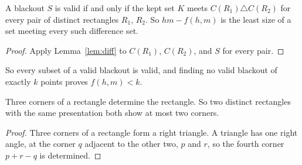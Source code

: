 \begin{corollary}\label{cor:hitting}
A blackout $S$ is valid if and only if the kept set $K$ meets
$C(R_1)\triangle C(R_2)$ for every pair of distinct rectangles $R_1$, $R_2$. So
$hm-f(h,m)$ is the least size of a set meeting every such difference set.
\end{corollary}

\begin{proof}
Apply Lemma~\ref{lem:diff} to $C(R_1)$, $C(R_2)$, and $S$ for every pair.
\end{proof}

So every subset of a valid blackout is valid, and finding no valid blackout of exactly
$k$ points proves $f(h,m)<k$.

\begin{lemma}\label{lem:threecorners}
Three corners of a rectangle determine the rectangle. So two distinct rectangles with
the same presentation both show at most two corners.
\end{lemma}

\begin{proof}
Three corners of a rectangle form a right triangle. A triangle has one right angle, at
the corner $q$ adjacent to the other two, $p$ and $r$, so the fourth corner $p+r-q$ is
determined.
\end{proof}
